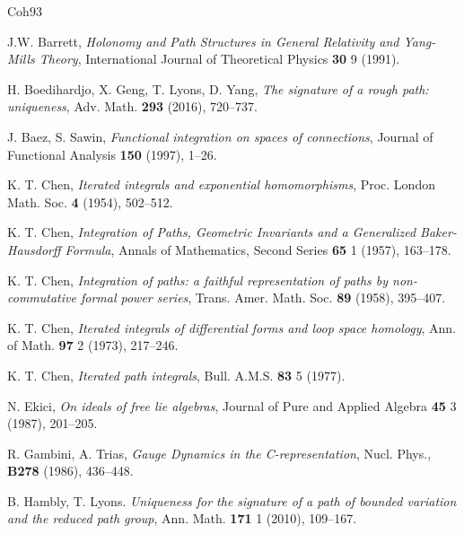 \documentclass{amsart}
\begin{document}
\begin{thebibliography}{Coh93}


J.W. Barrett, \emph{Holonomy and Path Structures in General Relativity and Yang-Mills Theory}, International Journal of Theoretical Physics \textbf{30} 9 (1991).


H. Boedihardjo, X. Geng, T. Lyons, D. Yang, \emph{The signature of a rough path: uniqueness}, Adv. Math. \textbf{293} (2016), 720--737.


J. Baez, S. Sawin, \emph{Functional integration on spaces of connections}, Journal of Functional Analysis \textbf{150} (1997), 1--26.


K. T. Chen, \emph{Iterated integrals and exponential homomorphisms}, Proc. London Math. Soc. \textbf{4} (1954), 502--512.

K. T. Chen, \emph{Integration of Paths, Geometric Invariants and a Generalized Baker-Hausdorff Formula}, Annals of Mathematics, Second Series \textbf{65} 1 (1957), 163--178.

K. T. Chen, \emph{Integration of paths: a faithful representation of paths by non-commutative formal power series}, Trans. Amer. Math. Soc. \textbf{89} (1958), 395--407.

K. T. Chen, \emph{Iterated integrals of differential forms and loop space homology}, Ann. of Math. \textbf{97} 2 (1973), 217--246.

K. T. Chen, \emph{Iterated path integrals}, Bull. A.M.S. \textbf{83} 5 (1977).


N. Ekici, \emph{On ideals of free lie algebras}, Journal of Pure and Applied Algebra \textbf{45} 3 (1987), 201--205.


R. Gambini, A. Trias, \emph{Gauge Dynamics in the C-representation}, Nucl. Phys., \textbf{B278} (1986), 436--448.

B. Hambly, T. Lyons. \emph{Uniqueness for the signature of a path of bounded variation and the reduced path group}, Ann. Math. \textbf{171} 1
(2010), 109--167.


\end{thebibliography}
\end{document}
